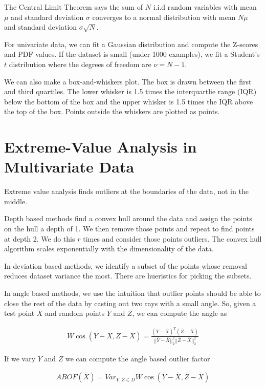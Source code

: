 \documentclass[a4paper]{article}
\begin{document}
The Central Limit Theorem says the sum of $N$ i.i.d random variables with mean
$\mu$ and standard deviation $\sigma$ converges to a normal distribution with
mean $N \mu$ and standard deviation $\sigma \sqrt{N}$.

For univariate data, we can fit a Gaussian distribution and compute the Z-scores
and PDF values. If the dataset is small (under 1000 examples), we fit a
Student's $t$ distribution where the degrees of freedom are $\nu = N - 1$.

We can also make a box-and-whiskers plot. The box is drawn between the first
and third quartiles. The lower whisker is 1.5 times the interquartlie range
(IQR) below the bottom of the box and the upper whisker is 1.5 times the IQR
above the top of the box. Points outside the whiskers are plotted as points.

\section{Extreme-Value Analysis in Multivariate Data}
Extreme value analysis finds outliers at the boundaries of the data, not
in the middle.

Depth based methods find a convex hull around the data and assign the points
on the hull a depth of 1. We then remove those points and repeat to find points
at depth 2. We do this $r$ times and consider those points outliers. The
convex hull algorithm scales exponentially with the dimensionality of the data.

In deviation based methods, we identify a subset of the points whose removal
reduces dataset variance the most. There are hueristics for picking the
subsets.

In angle based methods, we use the intuition that outlier points should be
able to close the rest of the data by casting out two rays with a small angle.
So, given a test point $\bar{X}$ and random points $\bar{Y}$ and $\bar{Z}$,
we can compute the angle as

\begin{align}
  W \cos{(\bar{Y} - \bar{X}, \bar{Z} - \bar{X})}
    = \frac{(\bar{Y} - \bar{X})^T (\bar{Z} - \bar{X})}{
    ||\bar{Y} - \bar{X}||_2^2 ||\bar{Z} - \bar{X}||_2^2
    }
\end{align}

If we vary $\bar{Y}$ and $\bar{Z}$ we can compute the angle based outlier
factor

\begin{align}
  ABOF(\bar{X}) = Var_{Y, Z \in D}{W \cos{(\bar{Y} - \bar{X},
  \bar{Z} - \bar{X})}}
\end{align}
\end{document}
